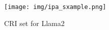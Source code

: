 \begin{figure}[H]
\label{CRI set for Llama2}
    \centering
    \texttt{[image: img/ipa\_sxample.png]}
    \caption{CRI set for Llama2}
    \label{fig:enter-label}
\end{figure}